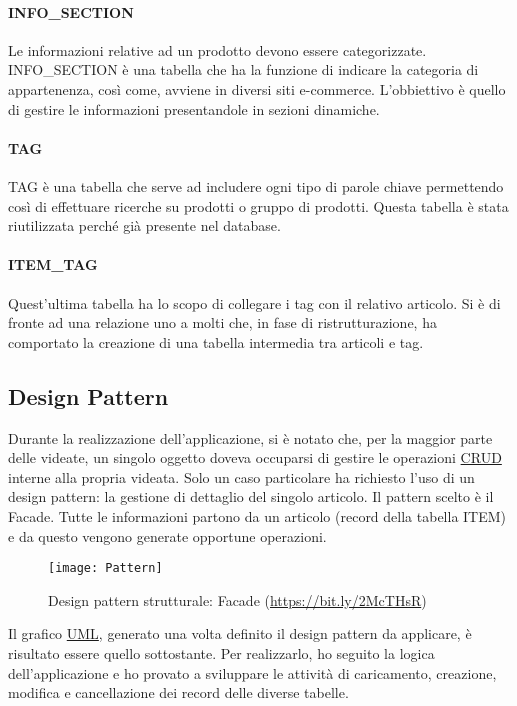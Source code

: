 \paragraph{INFO\_SECTION}
Le informazioni relative ad un prodotto devono essere categorizzate. INFO\_SECTION è una tabella che ha la funzione di indicare la categoria di appartenenza, così come, avviene in diversi siti e-commerce. L'obbiettivo è quello di gestire le informazioni presentandole in sezioni dinamiche. 

\paragraph{TAG}
TAG è una tabella che serve ad includere ogni tipo di parole chiave permettendo così di effettuare ricerche su prodotti o gruppo di prodotti. Questa tabella è stata riutilizzata perché già presente nel database.

\paragraph{ITEM\_TAG}
Quest'ultima tabella ha lo scopo di collegare i tag con il relativo articolo. Si è di fronte ad una relazione uno a molti che, in fase di ristrutturazione, ha comportato la creazione di una tabella intermedia tra articoli e tag.



\subsection{Design Pattern}
Durante la realizzazione dell'applicazione, si è notato che, per la maggior parte delle videate, un singolo oggetto doveva occuparsi di gestire le operazioni \hyperref[CRUD]{CRUD} interne alla propria videata. Solo un caso particolare ha richiesto l'uso di un design pattern: la gestione di dettaglio del singolo articolo.
Il pattern scelto è il Facade. Tutte le informazioni partono da un articolo (record della tabella ITEM) e da questo vengono generate opportune operazioni.\\

\begin{figure}[!h] 
	\centering 
	\texttt{[image: Pattern]} 
	\caption{Design pattern strutturale: Facade (\url{https://bit.ly/2McTHsR})}
	\label{Pattern}
\end{figure}


Il grafico \hyperref[UMLl]{UML}, generato una volta definito il design pattern da applicare, è risultato essere quello sottostante. Per realizzarlo, ho seguito la logica dell'applicazione e ho provato a sviluppare le attività di caricamento, creazione, modifica e cancellazione dei record delle diverse tabelle.

